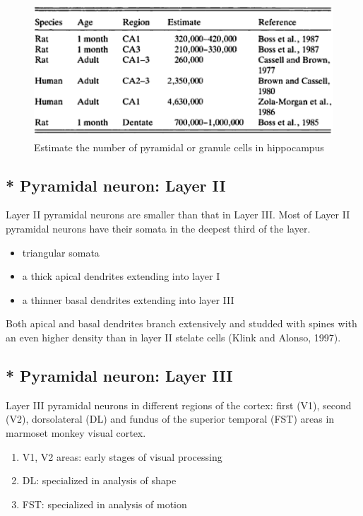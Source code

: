 \begin{figure}[hbt]
  \centerline{\includegraphics[height=5cm,
    angle=0]{./images/hippocampus_number.eps}}
 \caption{Estimate the number of pyramidal or granule cells in
   hippocampus}
\label{fig:pyramidal_number}
\end{figure}



\subsection{ * Pyramidal neuron: Layer II}
\label{sec:pyramidal-neuron-layer-II}

Layer II pyramidal neurons are smaller than that in Layer III.
Most of Layer II pyramidal neurons have their somata in the deepest third of the
layer. 
\begin{itemize}
  \item triangular somata
  \item a thick apical dendrites extending into layer I
  \item a thinner basal dendrites extending into layer III
\end{itemize}
Both apical and basal dendrites branch extensively and studded with spines with
an even higher density than in layer II stelate cells (Klink and Alonso, 1997).

\subsection{ * Pyramidal neuron: Layer III}
\label{sec:pyramidal-neuron-layer-III}

Layer III pyramidal neurons in different regions of the cortex: first (V1),
second (V2), dorsolateral (DL) and fundus of the superior temporal (FST) areas
in marmoset monkey visual cortex.
\begin{enumerate}
  \item V1, V2 areas: early stages of visual processing

  \item DL: specialized in analysis of shape
  \item FST: specialized in analysis of motion
\end{enumerate}

